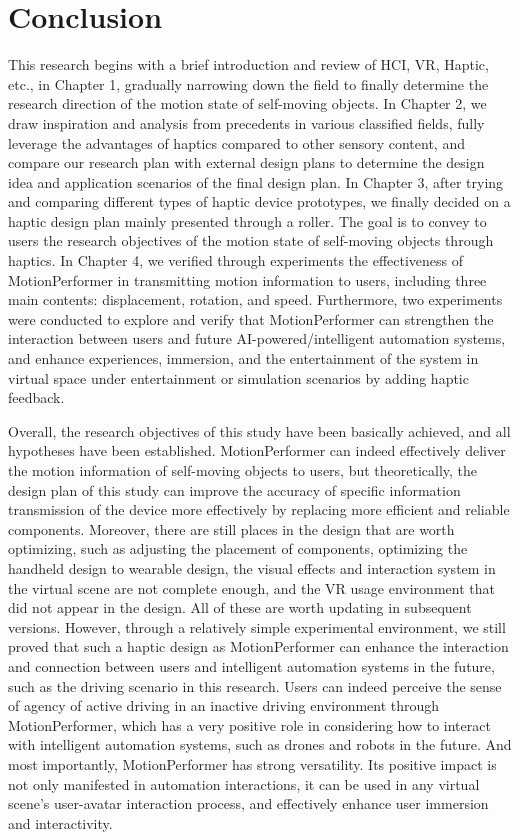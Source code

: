 
\chapter{Conclusion}
This research begins with a brief introduction and review of HCI, VR, Haptic, etc., in Chapter 1, gradually narrowing down the field to finally determine the research direction of the motion state of self-moving objects. In Chapter 2, we draw inspiration and analysis from precedents in various classified fields, fully leverage the advantages of haptics compared to other sensory content, and compare our research plan with external design plans to determine the design idea and application scenarios of the final design plan. In Chapter 3, after trying and comparing different types of haptic device prototypes, we finally decided on a haptic design plan mainly presented through a roller. The goal is to convey to users the research objectives of the motion state of self-moving objects through haptics. In Chapter 4, we verified through experiments the effectiveness of MotionPerformer in transmitting motion information to users, including three main contents: displacement, rotation, and speed. Furthermore, two experiments were conducted to explore and verify that MotionPerformer can strengthen the interaction between users and future AI-powered/intelligent automation systems, and enhance experiences, immersion, and the entertainment of the system in virtual space under entertainment or simulation scenarios by adding haptic feedback.

Overall, the research objectives of this study have been basically achieved, and all hypotheses have been established. MotionPerformer can indeed effectively deliver the motion information of self-moving objects to users, but theoretically, the design plan of this study can improve the accuracy of specific information transmission of the device more effectively by replacing more efficient and reliable components. Moreover, there are still places in the design that are worth optimizing, such as adjusting the placement of components, optimizing the handheld design to wearable design, the visual effects and interaction system in the virtual scene are not complete enough, and the VR usage environment that did not appear in the design. All of these are worth updating in subsequent versions. However, through a relatively simple experimental environment, we still proved that such a haptic design as MotionPerformer can enhance the interaction and connection between users and intelligent automation systems in the future, such as the driving scenario in this research. Users can indeed perceive the sense of agency of active driving in an inactive driving environment through MotionPerformer, which has a very positive role in considering how to interact with intelligent automation systems, such as drones and robots in the future. And most importantly, MotionPerformer has strong versatility. Its positive impact is not only manifested in automation interactions, it can be used in any virtual scene's user-avatar interaction process, and effectively enhance user immersion and interactivity. 

